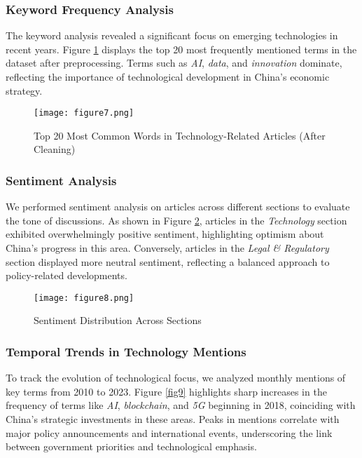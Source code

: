 \documentclass{article}
\begin{document}
\subsubsection{Keyword Frequency Analysis}

The keyword analysis revealed a significant focus on emerging technologies in recent years. Figure \ref{fig7} displays the top 20 most frequently mentioned terms in the dataset after preprocessing. Terms such as \textit{AI}, \textit{data}, and \textit{innovation} dominate, reflecting the importance of technological development in China’s economic strategy.

\begin{figure}[H]
    \centering
    \texttt{[image: figure7.png]}
    \caption{Top 20 Most Common Words in Technology-Related Articles (After Cleaning)}
    \label{fig7}
\end{figure}

\subsubsection{Sentiment Analysis}

We performed sentiment analysis on articles across different sections to evaluate the tone of discussions. As shown in Figure \ref{fig8}, articles in the \textit{Technology} section exhibited overwhelmingly positive sentiment, highlighting optimism about China’s progress in this area. Conversely, articles in the \textit{Legal \& Regulatory} section displayed more neutral sentiment, reflecting a balanced approach to policy-related developments.

\begin{figure}[H]
    \centering
    \texttt{[image: figure8.png]}
    \caption{Sentiment Distribution Across Sections}
    \label{fig8}
\end{figure}

\subsubsection{Temporal Trends in Technology Mentions}

To track the evolution of technological focus, we analyzed monthly mentions of key terms from 2010 to 2023. Figure \ref{fig9} highlights sharp increases in the frequency of terms like \textit{AI}, \textit{blockchain}, and \textit{5G} beginning in 2018, coinciding with China’s strategic investments in these areas. Peaks in mentions correlate with major policy announcements and international events, underscoring the link between government priorities and technological emphasis.
\end{document}
